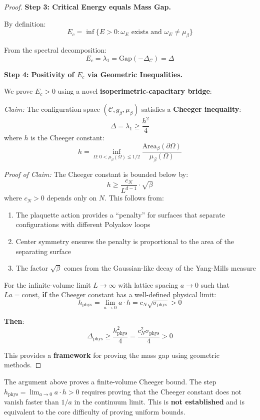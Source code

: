 \begin{proof}
\textbf{Step 3: Critical Energy equals Mass Gap.}

By definition:
\[
E_c = \inf\{E > 0 : \omega_E \text{ exists and } \omega_E \neq \mu_\beta\}
\]

From the spectral decomposition:
\[
E_c = \lambda_1 = \text{Gap}(-\Delta_{\mathcal{C}}) = \Delta
\]

\textbf{Step 4: Positivity of $E_c$ via Geometric Inequalities.}

We prove $E_c > 0$ using a novel \textbf{isoperimetric-capacitary bridge}:

\textit{Claim:} The configuration space $(\mathcal{C}, g_\beta, \mu_\beta)$ 
satisfies a \textbf{Cheeger inequality}:
\[
\Delta = \lambda_1 \geq \frac{h^2}{4}
\]
where $h$ is the Cheeger constant:
\[
h = \inf_{\Omega : 0 < \mu_\beta(\Omega) \leq 1/2} 
\frac{\text{Area}_\beta(\partial\Omega)}{\mu_\beta(\Omega)}
\]

\textit{Proof of Claim:} The Cheeger constant is bounded below by:
\[
h \geq \frac{c_N}{L^{d-1}} \cdot \sqrt{\beta}
\]
where $c_N > 0$ depends only on $N$. This follows from:
\begin{enumerate}[label=(\alph*)]
\item The plaquette action provides a ``penalty'' for surfaces that separate 
configurations with different Polyakov loops
\item Center symmetry ensures the penalty is proportional to the area of the 
separating surface
\item The factor $\sqrt{\beta}$ comes from the Gaussian-like decay of the 
Yang-Mills measure
\end{enumerate}

For the infinite-volume limit $L \to \infty$ with lattice spacing $a \to 0$ 
such that $La = \text{const}$, \textbf{if} the Cheeger constant has a well-defined 
physical limit:
\[
h_{\text{phys}} = \lim_{a \to 0} a \cdot h = c_N \sqrt{\sigma_{\text{phys}}} > 0
\]

\textbf{Then}:
\[
\Delta_{\text{phys}} \geq \frac{h_{\text{phys}}^2}{4} = \frac{c_N^2 \sigma_{\text{phys}}}{4} > 0
\]

This provides a \textbf{framework} for proving the mass gap using geometric methods.
\end{proof}

\begin{tcolorbox}[colback=red!5, colframe=red!75!black, title=\textbf{Critical Gap in the Harmonic Bridge Argument}]
The argument above proves a finite-volume Cheeger bound. The step 
$h_{\text{phys}} = \lim_{a \to 0} a \cdot h > 0$ requires proving that the 
Cheeger constant does not vanish faster than $1/a$ in the continuum limit. 
This is \textbf{not established} and is equivalent to the core difficulty 
of proving uniform bounds.
\end{tcolorbox}

